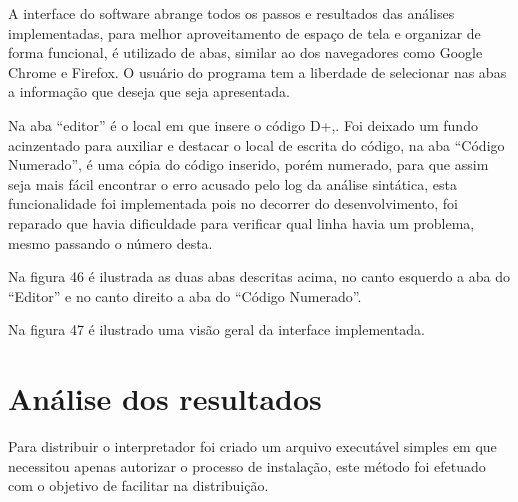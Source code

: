 \documentclass[12pt,oneside,a4paper,chapter=TITLE,section=TITLE,sumario=tradicional]{abntex2}
\begin{document}
\begin{figure}[htb]
\end{figure} 

A interface do software abrange todos os passos e resultados das análises implementadas, para melhor aproveitamento de espaço de tela e organizar de forma funcional, é utilizado de abas, similar ao dos navegadores como Google Chrome e Firefox. O usuário do programa tem a liberdade de selecionar nas abas a informação que deseja que seja apresentada. 

Na aba “editor” é o local em que insere o código D+,. Foi deixado um fundo acinzentado para auxiliar e destacar o local de escrita do código, na aba “Código Numerado”, é uma cópia do código inserido, porém numerado, para que assim seja mais fácil encontrar o erro acusado pelo log da análise sintática, esta funcionalidade foi implementada pois no decorrer do desenvolvimento, foi reparado que havia dificuldade para verificar qual linha havia um problema, mesmo passando o número desta. 

Na figura 46 é ilustrada as duas abas descritas acima, no canto esquerdo a aba do “Editor” e no canto direito a aba do “Código Numerado”. 

\begin{figure}[htb]
\end{figure}

Na figura 47 é ilustrado uma visão geral da interface implementada. 

\begin{figure}[htb]
\end{figure}


\chapter{Análise dos resultados}
\label{cap:analiseresultados}

Para distribuir o interpretador foi criado um arquivo executável simples em que necessitou apenas autorizar o processo de instalação, este método foi efetuado com o objetivo de facilitar na distribuição.
\end{document}
